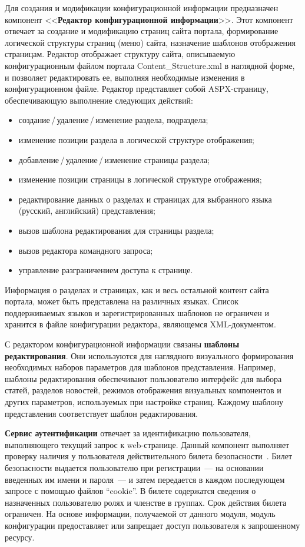 \begin{multicols}{2}
 Для создания и модификации конфигурационной информации предназначен
компонент <<\textbf{Редактор конфигурационной информации}>>. Этот компонент
отвечает за создание и модификацию страниц сайта портала, формирование логической
структуры страниц (меню) сайта, назначение шаб\-ло\-нов отображения страницам. Редактор
отоб\-ра\-жа\-ет структуру сайта, описываемую конфигурационным файлом портала
Content\_Structure.xml в наглядной форме, и позволяет редактировать ее, выполняя
необходимые изменения в конфигурационном файле. Редактор представляет собой
 ASPX-страницу, обеспечивающую выполнение сле\-ду\-ющих действий:
 \begin{itemize}
\item создание\,/\,удаление\,/\,изменение раздела, под\-раздела;
\item изменение позиции раздела в логической структуре отображения;
\item добавление\,/\,удаление\,/\,изменение страницы раз\-дела;
\item изменение позиции страницы в логической структуре отображения;
\item редактирование данных о разделах и страницах для выбранного языка (русский,
английский) представления;
\item вызов шаблона редактирования для страницы раздела;
\item вызов редактора командного запроса;
\item управление разграничением доступа к стра\-нице.
\end{itemize}
Информация о разделах и страницах, как и весь остальной контент сайта портала, может
быть представлена на различных языках. Список поддерживаемых языков и
зарегистрированных шаблонов не ограничен и хранится в файле конфигурации редактора,
являющемся XML-документом.

 С редактором конфигурационной информации связаны \textbf{шаблоны
редактирования}. Они используются для наглядного визуального формирования
необходимых наборов параметров для шаблонов представления. Например, шаблоны
редактирования обеспечивают пользователю интерфейс для выбора статей, разделов
новостей, режимов отображения визуальных компонентов и других параметров,
используемых при настройке страниц. Каждому шаблону представления соответствует
шаблон редактирования.

 \textbf{Сервис аутентификации} отвечает за идентификацию пользователя,
выполняющего текущий запрос к web-странице. Данный компонент выполняет проверку
наличия у пользователя действительного билета безопасности~\cite{11bos}. Билет
безопасности выдается пользователю при регистрации~--- на основании введенных им
имени и пароля~--- и затем передается в каждом последующем запросе с помощью файлов
``cookie''. В билете содержатся сведения о назначенных пользователю ролях и членстве
в группах. Срок действия билета ограничен. На основе информации, получаемой от
данного модуля, модуль конфигурации предоставляет или запрещает доступ пользователя
к запрошенному ресурсу.


\end{multicols}
